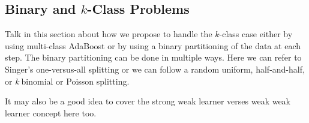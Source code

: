 \documentclass{article}
\begin{document}
\subsection{Binary and $k$-Class Problems}

Talk in this section about how we propose to handle the $k$-class case either by using multi-class AdaBoost or by using a binary partitioning of the data at each step.  The binary partitioning can be done in multiple ways.  Here we can refer to Singer's one-versus-all splitting or we can follow a random uniform, half-and-half, or $k~$binomial or Poisson splitting.

It may also be a good idea to cover the strong weak learner verses weak weak learner concept here too.

{}

\end{document}
